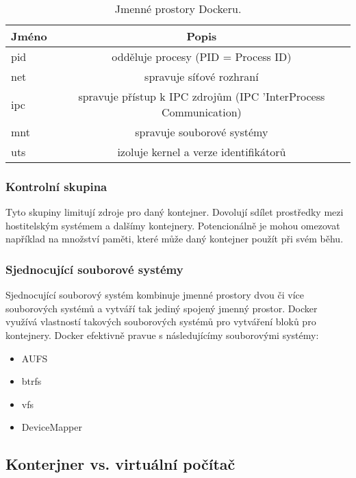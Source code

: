 \documentclass[thesis=B,czech]{FITthesis}[2019/12/23]
\begin{document}
\begin{table}[h!]
  \begin{center}
    \caption{Jmenné prostory Dockeru.}
    \label{tab:table1}
    \begin{tabular}{l|c} 
      \textbf{Jméno} & \textbf{Popis} \\
      \hline
      pid & odděluje procesy (PID = Process ID)\\
      net & spravuje síťové rozhraní\\
      ipc & spravuje přístup k IPC zdrojům (IPC 'InterProcess Communication)\\
      mnt & spravuje souborové systémy\\
      uts & izoluje kernel a verze identifikátorů\\
    \end{tabular}
  \end{center}
\end{table}

\subsubsection{Kontrolní skupina}

Tyto skupiny limitují zdroje pro daný kontejner. Dovolují sdílet prostředky mezi hostitelským systémem a dalšímy kontejnery. Potencionálně je mohou omezovat například na množství paměti, které může daný kontejner použít při svém běhu.  

\subsubsection{Sjednocující souborové systémy}

Sjednocující souborový systém kombinuje jmenné prostory dvou či více souborových systémů a vytváří tak jediný spojený jmenný prostor. Docker využívá vlastností takových souborových systémů pro vytváření bloků pro kontejnery. Docker efektivně pravue s následujícímy souborovými systémy: 

\begin{itemize}
    \item AUFS
    \item btrfs
    \item vfs
    \item DeviceMapper
\end{itemize}

\subsection{Konterjner vs. virtuální počítač}
\end{document}
